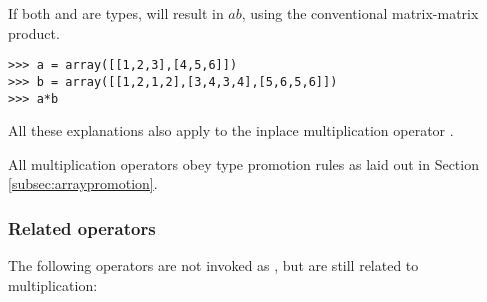 If both  and  are  types,
 will result in $a b$, using the conventional matrix-matrix
product.
\begin{verbatim}
>>> a = array([[1,2,3],[4,5,6]])
>>> b = array([[1,2,1,2],[3,4,3,4],[5,6,5,6]])
>>> a*b
\end{verbatim}

All these explanations also apply to the inplace multiplication
operator \code{*=}.

All multiplication operators obey type promotion rules as laid out
in Section \ref{subsec:arraypromotion}.

\subsubsection{Related operators}
The following operators are not invoked as , but are still
related to multiplication:

